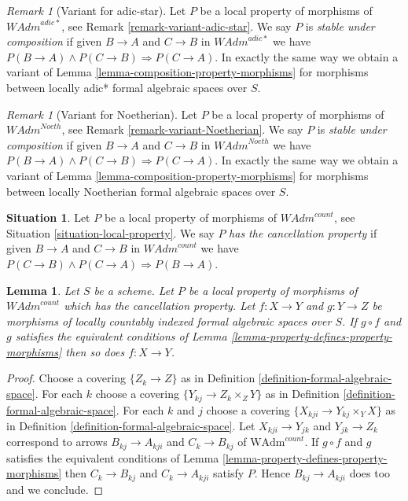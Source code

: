 \documentclass{stacks-project}
\theoremstyle{plain}
\newtheorem{lemma}[subsection]{Lemma}
\theoremstyle{definition}
\newtheorem{situation}[subsection]{Situation}
\theoremstyle{remark}
\newtheorem{remark}[subsection]{Remark}
\numberwithin{equation}{subsection}
\begin{document}
\begin{remark}[Variant for adic-star]
\label{remark-composition-variant-adic-star}
Let $P$ be a local property of morphisms of $\textit{WAdm}^{adic*}$, see
Remark \ref{remark-variant-adic-star}. We say $P$ is {\it stable under
composition} if given $B \to A$ and $C \to B$ in $\textit{WAdm}^{adic*}$
we have $P(B \to A) \wedge P(C \to B) \Rightarrow P(C \to A)$.
In exactly the same way we obtain a variant of
Lemma \ref{lemma-composition-property-morphisms}
for morphisms between locally adic* formal algebraic spaces over $S$.
\end{remark}

\begin{remark}[Variant for Noetherian]
\label{remark-composition-variant-Noetherian}
Let $P$ be a local property of morphisms of $\textit{WAdm}^{Noeth}$, see
Remark \ref{remark-variant-Noetherian}. We say $P$ is
{\it stable under composition} if given $B \to A$ and $C \to B$
in $\textit{WAdm}^{Noeth}$ we have
$P(B \to A) \wedge P(C \to B) \Rightarrow P(C \to A)$.
In exactly the same way we obtain a variant of
Lemma \ref{lemma-composition-property-morphisms}
for morphisms between locally Noetherian formal algebraic spaces over $S$.
\end{remark}

\begin{situation}
\label{situation-permanence-local-property}
Let $P$ be a local property of morphisms of $\textit{WAdm}^{count}$, see
Situation \ref{situation-local-property}. We say $P$
{\it has the cancellation property}
if given $B \to A$ and $C \to B$ in $\textit{WAdm}^{count}$
we have $P(C \to B) \wedge P(C \to A) \Rightarrow P(B \to A)$.
\end{situation}

\begin{lemma}
\label{lemma-permanence-property-morphisms}
Let $S$ be a scheme. Let $P$ be a local property of morphisms of
$\textit{WAdm}^{count}$ which has the cancellation property.
Let $f : X \to Y$ and $g : Y \to Z$ be morphisms of locally countably indexed
formal algebraic spaces over $S$. If $g \circ f$ and $g$
satisfies the equivalent conditions of
Lemma \ref{lemma-property-defines-property-morphisms}
then so does $f : X \to Y$.
\end{lemma}

\begin{proof}
Choose a covering $\{Z_k \to Z\}$ as in
Definition \ref{definition-formal-algebraic-space}.
For each $k$ choose a covering $\{Y_{kj} \to Z_k \times_Z Y\}$
as in Definition \ref{definition-formal-algebraic-space}.
For each $k$ and $j$ choose a covering $\{X_{kji} \to Y_{kj} \times_Y X\}$
as in Definition \ref{definition-formal-algebraic-space}.
Let $X_{kji} \to Y_{jk}$ and $Y_{jk} \to Z_k$
correspond to arrows
$B_{kj} \to A_{kji}$ and $C_k \to B_{kj}$ of
$\text{WAdm}^{count}$.
If $g \circ f$ and $g$ satisfies the equivalent conditions of
Lemma \ref{lemma-property-defines-property-morphisms}
then $C_k \to B_{kj}$ and $C_k \to A_{kji}$ satisfy $P$.
Hence $B_{kj} \to A_{kji}$ does too and we conclude.
\end{proof}
\end{document}
